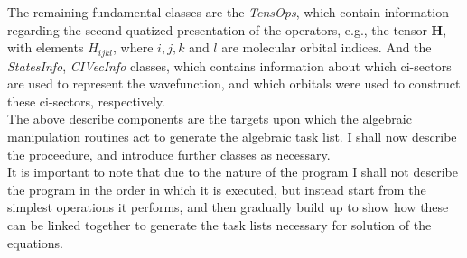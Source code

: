 \noindent The remaining fundamental classes are the \emph{TensOps}, which contain
information regarding the second-quatized presentation of the operators, e.g.,
the tensor $\mathbf{H}$, with elements $H_{ijkl}$, where $i, j, k$ and $l$ are
molecular orbital indices. And the \emph{StatesInfo}, \emph{CIVecInfo}
classes, which contains information about which ci-sectors are used to represent the 
wavefunction, and which orbitals were used to construct these ci-sectors,  respectively.\\

\noindent The above describe components are the targets upon which the 
algebraic manipulation routines act to generate the algebraic task list.
I shall now describe the proceedure, and introduce further classes as necessary.\\

\noindent It is important to note that due to the nature of the program I shall not describe the
program in the order in which it is executed, but instead start from the simplest operations it
performs, and then gradually build up to show how these can be linked together to
generate the task lists necessary for solution of the equations.



